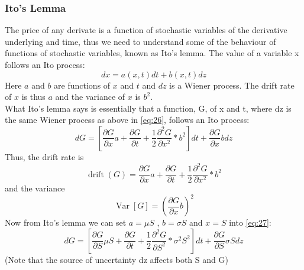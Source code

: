 \documentclass{article}
\DeclareMathOperator{\Var}{Var}
\DeclareMathOperator{\drift}{drift}
\begin{document}
\subsubsection{Ito's Lemma}
The price of any derivate is a function of stochastic variables of the derivative underlying and time, thus we need to understand some of the behaviour of functions of stochastic variables, known as Ito’s lemma. The value of a variable x follows an Ito process:
\begin{equation} \label{eq:26}
    dx = a(x, t) dt + b(x, t) dz
\end{equation}
Here $a$ and $b$ are functions of $x$ and $t$ and $dz$ is a Wiener process. The drift rate of $x$ is thus $a$ and the variance of $x$ is $b^{2}$. \\ [2ex]
What Ito’s lemma says is essentially that a function, G, of x and t, where dz is the same Wiener process as above in \ref{eq:26}, follows an Ito process:
\begin{equation} \label{eq:27}
    dG = \left[\frac{\partial G }{\partial x} a + \frac{\partial G }{\partial t} + \frac{1}{2}\frac{\partial^{2} G }{\partial x^{2}} * b^{2}\right]dt + \frac{\partial G }{\partial x} b dz
\end{equation}
Thus, the drift rate is 
\begin{equation} \label{eq:28}
    \drift(G) = \frac{\partial G }{\partial x} a + \frac{\partial G }{\partial t} + \frac{1}{2}\frac{\partial^{2} G }{\partial x^{2}} * b^{2}
\end{equation}
and the variance
\begin{equation} \label{eq:29}
    \Var[G] = (\frac{\partial G }{\partial x} b)^{2}
\end{equation}
Now from Ito’s lemma we can set $a = \mu S$ , $b = \sigma S$ and $x = S$ into \ref{eq:27}:
\begin{equation} \label{eq:30}
    dG = \left[\frac{\partial G }{\partial S} \mu S + \frac{\partial G }{\partial t} + \frac{1}{2}\frac{\partial^{2} G }{\partial S^{2}} * \sigma^{2} S^{2}\right]dt + \frac{\partial G }{\partial S} \sigma S dz
\end{equation}
(Note that the source of uncertainty dz affects both S and G)
\end{document}

